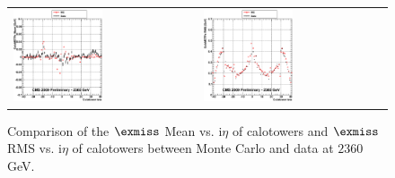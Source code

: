 \begin{figure}[h!]
 \centering
 \begin{tabular}{ll}
  \includegraphics[width=0.5\textwidth]{plots_DataVsMC_MB_2360GeV/g_calometPxMean_vs_ieta_2360.eps} &
  \includegraphics[width=0.5\textwidth]{plots_DataVsMC_MB_2360GeV/g_calometPxRMS_vs_ieta_2360.eps} \\
 \end{tabular}
 \caption{\small Comparison of the $\exmiss$ Mean vs. i$\eta$ of calotowers and $\exmiss$ RMS vs. i$\eta$ of calotowers between 
          Monte Carlo and data at $2360$ GeV.\label{fig:METx_MeanRMS_vs_ieta_2360}}
\end{figure}


